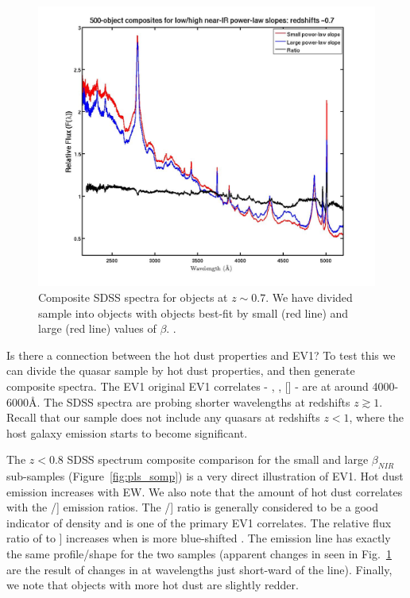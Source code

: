 \begin{figure}
  \centering
  \includegraphics[width=\textwidth]{figures/chapter05/z07_pls_comps.jpg}
  \caption[{Composite SDSS spectra for objects at $z\sim0.7$.}]{Composite SDSS spectra for objects at $z\sim0.7$. We have divided sample into objects with objects best-fit by small (red line) and large (red line) values of $\beta$. .}
  \label{fig:pls_comp}
\end{figure}

Is there a connection between the hot dust properties and EV1? 
To test this we can divide the quasar sample by hot dust properties, and then generate composite spectra. 
The EV1 original EV1 correlates - , \hb, [] - are at around 4000-6000\AA. 
The SDSS spectra are probing shorter wavelengths at redshifts $z\gtrsim1$.
Recall that our sample does not include any quasars at redshifts $z<1$, where the host galaxy emission starts to become significant. 

The $z < 0.8$ SDSS spectrum composite comparison for the small and large $\beta_{NIR}$ sub-samples (Figure~\ref{fig:pls_somp}) is a very direct illustration of EV1. 
Hot dust emission increases with  EW. 
We also note that the amount of hot dust correlates with the /] emission ratios. 
The /] ratio is generally considered to be a good indicator of density and is one of the primary EV1 correlates. 
The relative flux ratio of  to ] increases when  is more blue-shifted \citep{richards11}. 
The  emission line has exactly the same profile/shape for the two samples (apparent changes in  seen in Fig.~\ref{fig:pls_comp} are the result of changes in  at wavelengths just short-ward of the line). 
Finally, we note that objects with more hot dust are slightly redder.

